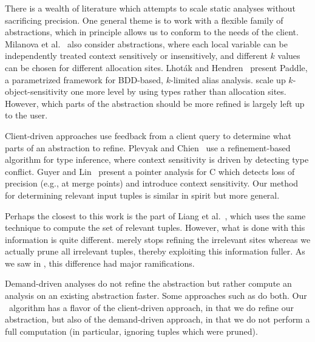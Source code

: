 
There is a wealth of literature which attempts to scale static analyses without
sacrificing precision.  One general theme is to work with a flexible family of
abstractions, which in principle allows us to conform to the needs of the
client.  Milanova et al.~\cite{kobj,MilanovaRountevRyder2005} also consider
abstractions, where each local variable can be independently treated context
sensitively or insensitively, and different $k$ values can be chosen for
different allocation sites.  Lhot\'{a}k and
Hendren~\cite{LhotakHendren2006,LhotakHendren2008} present Paddle, a
parametrized framework for BDD-based, $k$-limited alias analysis.
\cite{smaragdakis11context} scale up $k$-object-sensitivity one more level by
using types rather than allocation sites.  However, which parts of the
abstraction should be more refined is largely left up to the user.

Client-driven approaches use feedback from a client query to determine what
parts of an abstraction to refine.
Plevyak and Chien~\cite{PlevyakChien1994} use a refinement-based algorithm for
type inference, where context sensitivity is driven by detecting type conflict.
Guyer and Lin~\cite{GuyerLin2003} present a pointer analysis for C
which detects loss of precision (e.g., at merge points) and introduce context sensitivity.
Our method for determining relevant input tuples is similar in spirit but more general.

Perhaps the closest to this work is the part of Liang et al.~\cite{liang11minimal}, which
uses the same technique to compute the set of relevant tuples.  However, what
is done with this information is quite different.  \cite{liang11minimal} merely
stops refining the irrelevant sites whereas we actually prune all irrelevant
tuples, thereby exploiting this information fuller.  As we saw in
, this difference had major ramifications.


Demand-driven analyses \cite{HeintzeTardieu2001,ZhengRugina2008} do not refine
the abstraction but rather compute an analysis on an existing
abstraction faster.  Some approaches such as \cite{SridharanBodik2006} do both.
Our \PR\ algorithm has a flavor of the client-driven approach, in that we do
refine our abstraction, but also of the demand-driven approach, in that we do
not perform a full computation (in particular, ignoring tuples which were
pruned).

